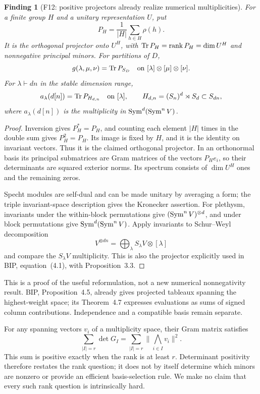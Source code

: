 \documentclass[11pt,a4paper]{article}
\newcommand{\fid}[1]{\textsf{#1}}\newcommand{\gate}[1]{\textsf{#1}}
\theoremstyle{named}\newtheorem{finding}{Finding}[section]
\theoremstyle{definition}\newtheorem{definition}[finding]{Definition}
\theoremstyle{remark}\newtheorem{remark}[finding]{Remark}
\begin{document}
\begin{finding}[\fid{F12}: positive projectors already realize numerical multiplicities]\label{f:projector}
For a finite group $H$ and a unitary representation $U$, put
\[
 P_H=\frac1{|H|}\sum_{h\in H}\rho(h).
\]
It is the orthogonal projector onto $U^H$, with $\operatorname{Tr} P_H=\operatorname{rank} P_H=\dim U^H$ and nonnegative principal minors. For partitions of $D$,
\[
 g(\lambda,\mu,\nu)=\operatorname{Tr} P_{S_D}
 \quad\text{on }[\lambda]\otimes[\mu]\otimes[\nu].
\]
For $\lambda\vdash dn$ in the stable dimension range,
\[
 a_\lambda(d[n])=\operatorname{Tr} P_{H_{d,n}}\quad\text{on }[\lambda],\qquad
 H_{d,n}=(S_n)^d\rtimes S_d\subset S_{dn},
\]
where $a_\lambda(d[n])$ is the multiplicity in $\operatorname{Sym}^d(\operatorname{Sym}^nV)$.
\end{finding}
\begin{proof}
Inversion gives $P_H^*=P_H$, and counting each element $|H|$ times in the double sum gives $P_H^2=P_H$. Its image is fixed by $H$, and it is the identity on invariant vectors. Thus it is the claimed orthogonal projector. In an orthonormal basis its principal submatrices are Gram matrices of the vectors $P_He_i$, so their determinants are squared exterior norms. Its spectrum consists of $\dim U^H$ ones and the remaining zeros.

Specht modules are self-dual and can be made unitary by averaging a form; the triple invariant-space description gives the Kronecker assertion. For plethysm, invariants under the within-block permutations give $(\operatorname{Sym}^n V)^{\otimes d}$, and under block permutations give $\operatorname{Sym}^d(\operatorname{Sym}^nV)$. Apply invariants to Schur--Weyl decomposition
\[
 V^{\otimes dn}=\bigoplus_\lambda S_\lambda V\otimes[\lambda]
\]
and compare the $S_\lambda V$ multiplicity. This is also the projector explicitly used in BIP, equation~(4.1), with Proposition~3.3.
\end{proof}
This is a proof of the useful reformulation, not a new numerical nonnegativity result. BIP, Proposition~4.5, already gives projected tableaux spanning the highest-weight space; its Theorem~4.7 expresses evaluations as sums of signed column contributions. Independence and a compatible basis remain separate.

For any spanning vectors $v_i$ of a multiplicity space, their Gram matrix satisfies
\[
 \sum_{|I|=r}\det G_I=\sum_{|I|=r}\bigl\|\bigwedge_{i\in I}v_i\bigr\|^2.
\]
This sum is positive exactly when the rank is at least $r$. Determinant positivity therefore restates the rank question; it does not by itself determine which minors are nonzero or provide an efficient basis-selection rule. We make no claim that every such rank question is intrinsically hard.
\end{document}
